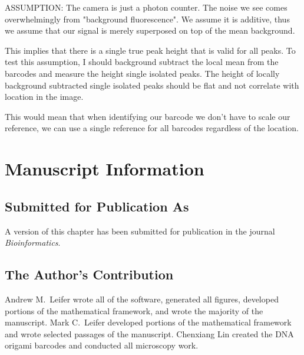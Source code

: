 ASSUMPTION: The camera is just a photon counter. The noise we see comes overwhelmingly from "background fluorescence". We assume it is additive, thus we assume that our signal is merely superposed on top of the mean background. 

This implies that there is a single true peak height that is valid for all peaks. To test this assumption, I should background subtract the local mean from the barcodes and measure the height single isolated peaks. The height of locally background subtracted single isolated peaks should be flat and not correlate with location in the image.

This would mean that when identifying our barcode we don't have to scale our reference, we can use a single reference for all barcodes regardless of the location.


\section{Manuscript Information}
\subsection{Submitted for Publication As}
A version of this chapter has been submitted for publication in the journal \textit{Bioinformatics}.

\subsection{The Author's Contribution}
Andrew M.~Leifer wrote all of the software, generated all figures, developed portions of the mathematical framework, and wrote the majority of the manuscript. Mark C.~Leifer developed portions of the mathematical framework and wrote selected passages of the manuscript. Chenxiang Lin created the DNA origami barcodes and conducted all microscopy work. 
 